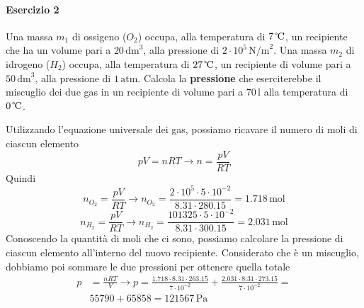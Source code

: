 \paragraph{Esercizio 2}
Una massa $m_1$ di ossigeno ($O_2$) occupa, alla temperatura di $7\,\text{\textcelsius}$, un 
recipiente che ha un volume pari a $20\,\text{dm}^3$, alla pressione di $2\cdot10^5\,\text{N/m}^2$. 
Una massa $m_2$ di idrogeno ($H_2$) occupa, alla temperatura di $27\,\text{\textcelsius}$, un 
recipiente di volume pari a $50\,\text{dm}^3$, alla pressione di $1\,\text{atm}$. Calcola la 
\textbf{pressione} che eserciterebbe il miscuglio dei due gas in un recipiente di volume pari a 
$70\,\text{l}$ alla temperatura di $0\,\text{\textcelsius}$.
\divisor

Utilizzando l'equazione universale dei gas, possiamo ricavare il numero di moli di ciascun
elemento
\begin{equation*}
  pV=nRT \rightarrow n = \frac{pV}{RT}
\end{equation*}
Quindi
\begin{equation*}
  n_{O_2} = \frac{pV}{RT} \rightarrow n_{O_2} = \frac{2\cdot10^5\cdot5\cdot10^{-2}}{8.31\cdot
  280.15} = 1.718\,\text{mol}
\end{equation*}
\begin{equation*}
  n_{H_2} = \frac{pV}{RT} \rightarrow n_{H_2} = \frac{101325\cdot5\cdot10^{-2}}{8.31\cdot
  300.15} = 2.031\,\text{mol}
\end{equation*}
Conoscendo la quantità di moli che ci sono, possiamo calcolare la pressione di ciascun elemento
all'interno del nuovo recipiente. Considerato che è un miscuglio, dobbiamo poi sommare le due
pressioni per ottenere quella totale
\begin{align*}
  p &= \frac{nRT}{V} \rightarrow p = \frac{1.718\cdot8.31\cdot263.15}{7\cdot10^{-2}}+
  \frac{2.031\cdot8.31\cdot273.15}{7\cdot10^{-2}}=\\&55790+65858=\boxed{121567\,\text{Pa}}
\end{align*}



